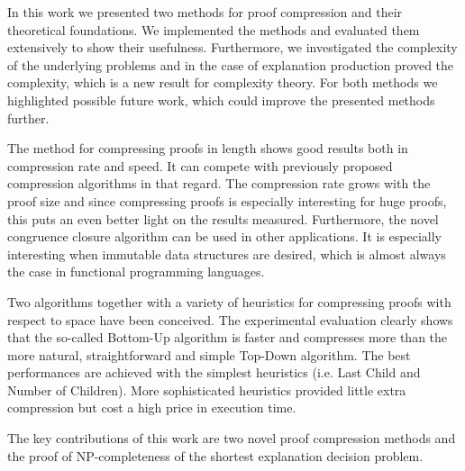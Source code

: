 
In this work we presented two methods for proof compression and their theoretical foundations.
We implemented the methods and evaluated them extensively to show their usefulness.
Furthermore, we investigated the complexity of the underlying problems and in the case of explanation production proved the complexity, which is a new result for complexity theory.
For both methods we highlighted possible future work, which could improve the presented methods further.

The method for compressing proofs in length shows good results both in compression rate and speed.
It can compete with previously proposed compression algorithms in that regard.
The compression rate grows with the proof size and since compressing proofs is especially interesting for huge proofs, this puts an even better light on the results measured.
Furthermore, the novel congruence closure algorithm can be used in other applications.
It is especially interesting when immutable data structures are desired, which is almost always the case in functional programming languages.

Two algorithms together with a variety of heuristics for compressing proofs with respect to space have been conceived. 
The experimental evaluation clearly shows that the so-called Bottom-Up algorithm is faster and compresses more than the more natural, straightforward and simple Top-Down algorithm. 
The best performances are achieved with the simplest heuristics (i.e. Last Child and Number of Children). 
More sophisticated heuristics provided little extra compression but cost a high price in execution time. 

The key contributions of this work are two novel proof compression methods and the proof of NP-completeness of the shortest explanation decision problem.